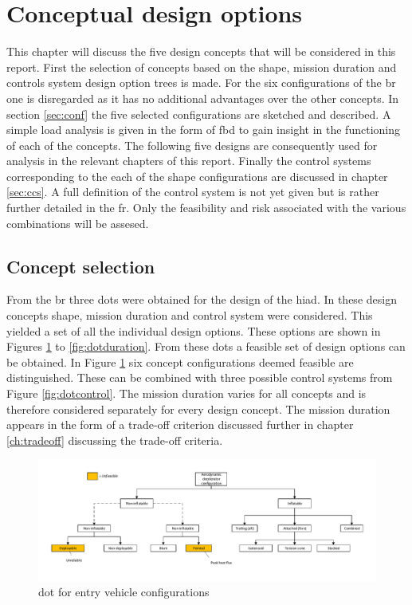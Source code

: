 \section{Conceptual design options} \label{ch:options}
This chapter will discuss the five design concepts that will be considered in this report. First the selection of concepts based on the shape, mission duration and controls system design option trees is made. For the six configurations of the \gls{br} one is disregarded as it has no additional advantages over the other concepts. In section \ref{sec:conf} the five selected configurations are sketched and described. A simple load analysis is given in the form of \gls{fbd} to gain insight in the functioning of each of the concepts. The following five designs are consequently used for analysis in the relevant chapters of this report. Finally the control systems corresponding to the each of the shape configurations are discussed in chapter \ref{sec:ccs}. A full definition of the control system is not yet given but is rather further detailed in the \gls{fr}. Only the feasibility and risk associated with the various combinations will be assesed.



\subsection{Concept selection}
 From the \acrfull{br} three \glspl{dot} were obtained for the design of the \gls{hiad}. In these design concepts shape, mission duration and control system were considered. This yielded a set of all the individual design options. These options are shown in Figures \ref{fig:dotshape} to \ref{fig:dotduration}. From these \glspl{dot} a feasible set of design options can be obtained. In Figure  \ref{fig:dotshape} six concept configurations deemed feasible are distinguished. These can be combined with three possible control systems from Figure  \ref{fig:dotcontrol}. The mission duration varies for all concepts and is therefore considered separately for every design concept. The mission duration appears in the form of a trade-off criterion discussed further in chapter \ref{ch:tradeoff} discussing the trade-off criteria.

\begin{figure}[H]
\hspace{-23mm}
\includegraphics[width = 1.25\textwidth]{Figure/DOT_configuration.pdf}
\vspace{-5mm}
\caption{\acrfull{dot} for entry vehicle configurations}
\label{fig:dotshape}
\end{figure}

